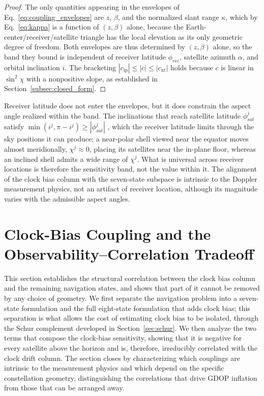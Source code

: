 \documentclass[letterpaper,times]{IONconf-v2}
\theoremstyle{plain}
\theoremstyle{remark}
\begin{document}
\begin{proof}
The only quantities appearing in the envelopes of Eq.~\eqref{eq:coupling_envelopes} are $z$, $\beta$, and the normalized slant range $\kappa$, which by Eq.~\eqref{eq:kappa} is a function of $(z,\beta)$ alone, because the Earth-center/receiver/satellite triangle has the local elevation as its only geometric degree of freedom. Both envelopes are thus determined by $(z,\beta)$ alone, so the band they bound is independent of receiver latitude $\phi_{rec}$, satellite azimuth $\alpha$, and orbital inclination $i$. The bracketing $|c_{\mathrm{ip}}| \le |c| \le |c_{\mathrm{xt}}|$ holds because $c$ is linear in $\sin^2\chi$ with a nonpositive slope, as established in Section~\ref{subsec:closed_form}.
\end{proof}

Receiver latitude does not enter the envelopes, but it does constrain the aspect angle realized within the band. The inclinations that reach satellite latitude $\phi_{sat}^j$ satisfy $\min(i^j, \pi - i^j) \ge |\phi_{sat}^j|$ \parencite{Montenbruck2000}, which the receiver latitude limits through the sky positions it can produce; a near-polar shell viewed near the equator moves almost meridionally, $\chi^j \approx 0$, placing its satellites near the in-plane floor, whereas an inclined shell admits a wide range of $\chi^j$. What is universal across receiver locations is therefore the sensitivity band, not the value within it. The alignment of the clock bias column with the seven-state subspace is intrinsic to the Doppler measurement physics, not an artifact of receiver location, although its magnitude varies with the admissible aspect angles.

\vspace{-10pt}

\section{Clock-Bias Coupling and the Observability--Correlation Tradeoff}\label{sec:coupling}
This section establishes the structural correlation between the clock bias column and the remaining navigation states, and shows that part of it cannot be removed by any choice of geometry. We first separate the navigation problem into a seven-state formulation and the full eight-state formulation that adds clock bias; this separation is what allows the cost of estimating clock bias to be isolated, through the Schur complement developed in Section~\ref{sec:schur}. We then analyze the two terms that compose the clock-bias sensitivity, showing that it is negative for every satellite above the horizon and is, therefore, irreducibly correlated with the clock drift column. The section closes by characterizing which couplings are intrinsic to the measurement physics and which depend on the specific constellation geometry, distinguishing the correlations that drive GDOP inflation from those that can be arranged away.
\end{document}
